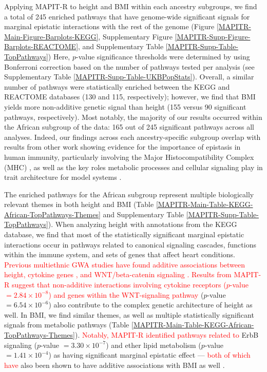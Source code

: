 \documentclass[10pt]{article}
\begin{document}
Applying MAPIT-R to height and BMI within each ancestry subgroups, we find a total of 245 enriched pathways that have genome-wide significant signals for marginal epistatic interactions with the rest of the genome (Figure \ref{MAPITR-Main-Figure-Barplots-KEGG}, Supplementary Figure \ref{MAPITR-Supp-Figure-Barplots-REACTOME}, and Supplementary Table \ref{MAPITR-Supp-Table-TopPathways}) Here, $p$-value significance thresholds were determined by using Bonferroni correction based on the number of pathways tested per analysis (see Supplementary Table \ref{MAPITR-Supp-Table-UKBPopStats}). Overall, a similar number of pathways were statistically enriched between the KEGG and REACTOME databases (130 and 115, respectively); however, we find that BMI yields more non-additive genetic signal than height (155 versus 90 significant pathways, respectively). Most notably, the majority of our results occurred within the African subgroup of the data: 165 out of 245 significant pathways across all analyses. Indeed, our findings across each ancestry-specific subgroup overlap with results from other work showing evidence for the importance of epistasis in human immunity, particularly involving the Major Histocompatibility Complex (MHC) \cite{Martin2002,Williams2005,Wan2010,Rose2012,Lareau2016,Opi2018,Zhang2019}, as well as the key roles metabolic processes and cellular signaling play in trait architecture for model systems \cite{Segre2005,Snitkin2011,Podgornaia2015,Sorrells2015,Tyler2017,Nghe2018,Jiao2019}. 

The enriched pathways for the African subgroup represent multiple biologically relevant themes in both height and BMI (Table \ref{MAPITR-Main-Table-KEGG-African-TopPathways-Themes} and Supplementary Table \ref{MAPITR-Supp-Table-TopPathways}). When analyzing height with annotations from the KEGG database, we find that most of the statistically significant marginal epistatic interactions occur in pathways related to canonical signaling cascades, functions within the immune system, and sets of genes that affect heart conditions. \textcolor{red}{Previous multiethnic GWA studies have found additive associations between height, cytokine genes \cite{Marouli2017}, and WNT/beta-catenin signaling \cite{Wood2014b}. Results from MAPIT-R suggest that non-additive interactions involving cytokine receptors ($p$-value $= 2.84\times 10^{-8}$) and genes within the WNT-signaling pathway} ($p$-value $= 6.54\times 10^{-6}$) also contribute to the complex genetic architecture of height as well. In BMI, we find similar themes, as well as multiple statistically significant signals from metabolic pathways (Table \ref{MAPITR-Main-Table-KEGG-African-TopPathways-Themes}). \textcolor{red}{Notably, MAPIT-R identified pathways related to} ErbB signaling ($p$-value $= 3.30\times 10^{-7}$) and ether lipid metabolism ($p$-value $= 1.41\times 10^{-4}$) as having significant marginal epistatic effect --- \textcolor{red}{both of which have} also been shown to have additive associations with BMI as well \cite{Locke2015,Salinas2016,Jha2018}. 
\end{document}
